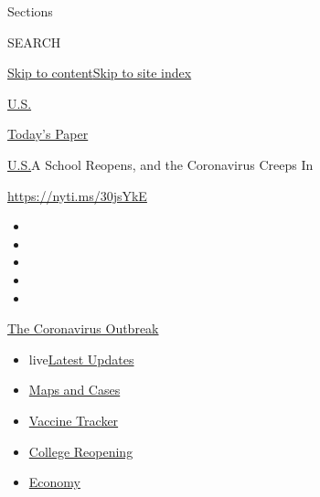 Sections

SEARCH

\protect\hyperlink{site-content}{Skip to
content}\protect\hyperlink{site-index}{Skip to site index}

\href{https://www.nytimes.com/section/us}{U.S.}

\href{https://myaccount.nytimes.com/auth/login?response_type=cookie\&client_id=vi}{}

\href{https://www.nytimes.com/section/todayspaper}{Today's Paper}

\href{/section/us}{U.S.}\textbar{}A School Reopens, and the Coronavirus
Creeps In

\url{https://nyti.ms/30jsYkE}

\begin{itemize}
\item
\item
\item
\item
\item
\end{itemize}

\href{https://www.nytimes.com/news-event/coronavirus?action=click\&pgtype=Article\&state=default\&region=TOP_BANNER\&context=storylines_menu}{The
Coronavirus Outbreak}

\begin{itemize}
\tightlist
\item
  live\href{https://www.nytimes.com/2020/08/04/world/coronavirus-cases.html?action=click\&pgtype=Article\&state=default\&region=TOP_BANNER\&context=storylines_menu}{Latest
  Updates}
\item
  \href{https://www.nytimes.com/interactive/2020/us/coronavirus-us-cases.html?action=click\&pgtype=Article\&state=default\&region=TOP_BANNER\&context=storylines_menu}{Maps
  and Cases}
\item
  \href{https://www.nytimes.com/interactive/2020/science/coronavirus-vaccine-tracker.html?action=click\&pgtype=Article\&state=default\&region=TOP_BANNER\&context=storylines_menu}{Vaccine
  Tracker}
\item
  \href{https://www.nytimes.com/2020/08/02/us/covid-college-reopening.html?action=click\&pgtype=Article\&state=default\&region=TOP_BANNER\&context=storylines_menu}{College
  Reopening}
\item
  \href{https://www.nytimes.com/live/2020/08/04/business/stock-market-today-coronavirus?action=click\&pgtype=Article\&state=default\&region=TOP_BANNER\&context=storylines_menu}{Economy}
\end{itemize}

